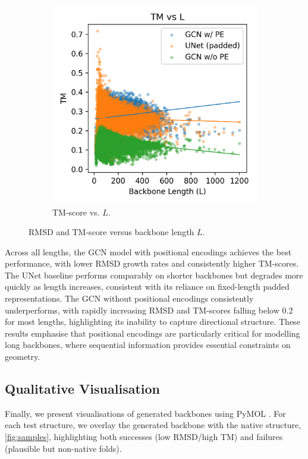 \documentclass[a4paper,12pt]{article}
\begin{document}
\begin{figure}[htbp]
\begin{subfigure}[b]{0.495\textwidth}
        \includegraphics[width=\linewidth]{tm_vs_L.png}
        \caption{TM-score vs. \(L\).}
        \label{fig:tm-vs-l}
    \end{subfigure}
    \caption{RMSD and TM-score versus backbone length \(L\).}
    \label{fig:rmsd-tm-vs-l}
\end{figure}

Across all lengths, the GCN model with positional encodings achieves the best performance, with lower RMSD growth rates and consistently higher TM-scores. The UNet baseline performs comparably on shorter backbones but degrades more quickly as length increases, consistent with its reliance on fixed-length padded representations. The GCN without positional encodings consistently underperforms, with rapidly increasing RMSD and TM-scores falling below \(0.2\) for most lengths, highlighting its inability to capture directional structure. These results emphasise that positional encodings are particularly critical for modelling long backbones, where sequential information provides essential constraints on geometry.

\subsection{Qualitative Visualisation}\label{subsec:visualisation}
Finally, we present visualisations of generated backbones using PyMOL \citep{PyMOL,JyMOL,AxPyMOL}. For each test structure, we overlay the generated backbone with the native structure, \cref{fig:samples}, highlighting both successes (low RMSD/high TM) and failures (plausible but non-native folds).
\end{document}
